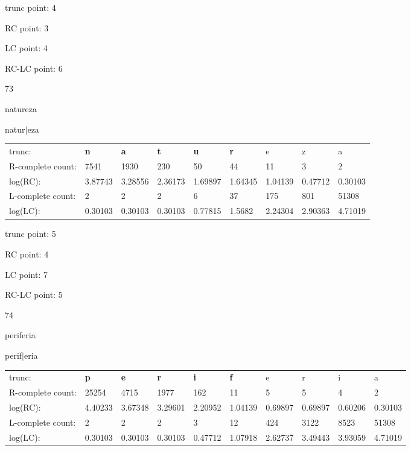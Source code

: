 \documentclass{article}
\begin{document}
trunc point: 4

RC point: 3

LC point: 4

RC-LC point: 6

\vspace{3em}



73

natureza

natur$|$eza

\vspace{1em}

\begin{tabular}{l|llllllll}

trunc: & {\color{red}\bf n} & {\color{red}\bf a} & {\color{red}\bf t} & {\color{red}\bf u} & {\color{red}\bf r} & e & z & a \\ 
R-complete count: & 7541 & 1930 & 230 & 50 & 44 & 11 & 3 & 2 \\ 
log(RC): & 3.87743 & 3.28556 & 2.36173 & 1.69897 & 1.64345 & 1.04139 & 0.47712 & 0.30103 \\ 
L-complete count: & 2 & 2 & 2 & 6 & 37 & 175 & 801 & 51308 \\ 
log(LC): & 0.30103 & 0.30103 & 0.30103 & 0.77815 & 1.5682 & 2.24304 & 2.90363 & 4.71019 \\ 
\end{tabular}

trunc point: 5

RC point: 4

LC point: 7

RC-LC point: 5

\vspace{3em}



74

periferia

perif$|$eria

\vspace{1em}

\begin{tabular}{l|lllllllll}

trunc: & {\color{red}\bf p} & {\color{red}\bf e} & {\color{red}\bf r} & {\color{red}\bf i} & {\color{red}\bf f} & e & r & i & a \\ 
R-complete count: & 25254 & 4715 & 1977 & 162 & 11 & 5 & 5 & 4 & 2 \\ 
log(RC): & 4.40233 & 3.67348 & 3.29601 & 2.20952 & 1.04139 & 0.69897 & 0.69897 & 0.60206 & 0.30103 \\ 
L-complete count: & 2 & 2 & 2 & 3 & 12 & 424 & 3122 & 8523 & 51308 \\ 
log(LC): & 0.30103 & 0.30103 & 0.30103 & 0.47712 & 1.07918 & 2.62737 & 3.49443 & 3.93059 & 4.71019 \\ 
\end{tabular}
\end{document}
